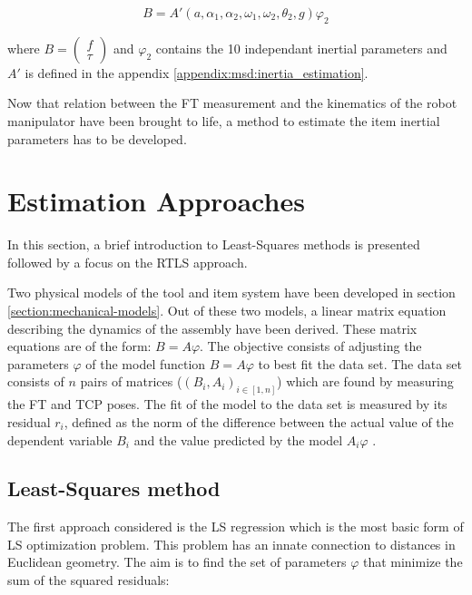 \documentclass[/home/francois/latex/report/main.tex]{subfiles}
\begin{document}
 \begin{equation}
   \label{background:eq:rmsd_inertia_estimation}
 B = A'(a, \alpha_1, \alpha_2, \omega_1, \omega_2, \theta_2, g) \varphi_2
 \end{equation}

 where $B =  \begin{pmatrix} f \\ \tau \end{pmatrix}$ and $\varphi_2$ contains the 10 independant inertial parameters and $A'$ is defined in the appendix \ref{appendix:msd:inertia_estimation}.

Now that relation between the \ac{FT} measurement and the kinematics of the robot manipulator have been brought to life, a method to estimate the item inertial parameters has to be developed.

\section{Estimation Approaches}
\label{section:estimation}

In this section, a brief introduction to Least-Squares methods is presented followed by a focus on the \ac{RTLS} approach.

Two physical models of the tool and item system have been developed in section \ref{section:mechanical-models}. Out of these two models, a linear matrix equation describing the dynamics of the assembly have been derived. These matrix equations are of the form: $B = A\varphi$. The objective consists of adjusting the parameters $\varphi$ of the model function $B = A\varphi$ to best fit the data set. The data set consists of $n$ pairs of matrices ($(B_i, A_i)_{i \in [1, n]}$) which are found by measuring the \ac{FT} and \ac{TCP} poses. The fit of the model to the data set is measured by its residual $r_i$, defined as the norm of the difference between the actual value of the dependent variable $B_i$ and the value predicted by the model $A_i \varphi$ \cite{Simoncelli2003}.

\subsection{Least-Squares method}
\label{subsection:ls}

The first approach considered is the \ac{LS} regression which is the most basic form of \ac{LS} optimization problem. This problem has an innate connection to distances in Euclidean geometry. The aim is to find the set of parameters $\varphi$ that minimize the sum of the squared residuals:
\end{document}
